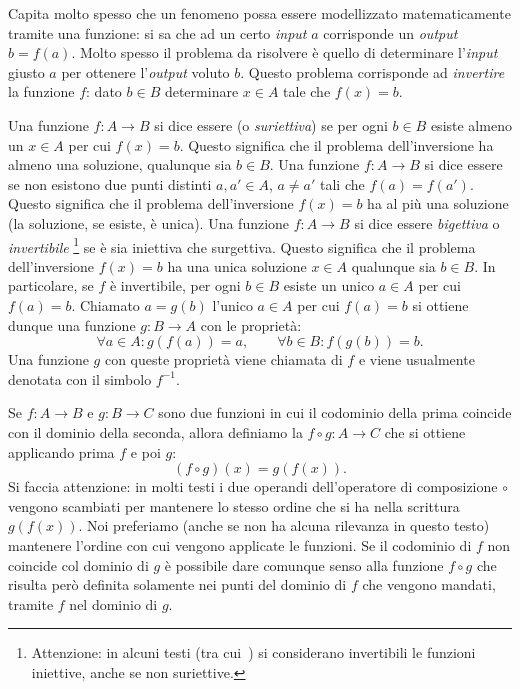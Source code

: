 Capita molto spesso che un fenomeno possa essere modellizzato matematicamente
tramite una funzione: si sa che ad un certo \emph{input} $a$ corrisponde
un \emph{output} $b=f(a)$. Molto spesso il problema da risolvere è
quello di determinare l'\emph{input} giusto $a$ per ottenere l'\emph{output}
voluto $b$. Questo problema corrisponde ad \emph{invertire} la funzione $f$:
dato $b\in B$ determinare $x\in A$ tale che $f(x) = b$.

Una funzione $f\colon A \to B$ si dice essere  (o \emph{suriettiva})
se per ogni $b\in B$ esiste almeno un $x\in A$ per cui $f(x)=b$. Questo
significa che il problema dell'inversione ha almeno una soluzione, qualunque
sia $b\in B$.
Una funzione $f\colon A \to B$ si dice essere 
se non esistono due punti distinti $a,a' \in A$, $a\neq a'$ tali
che $f(a) = f(a')$. Questo significa che il problema dell'inversione
$f(x)=b$ ha al più una soluzione (la soluzione, se esiste, è unica).
Una funzione $f\colon A \to B$ si dice essere \emph{bigettiva}
%
%
%
%
%
o
\emph{invertibile}%
\footnote{Attenzione: in alcuni testi (tra cui~\cite{Giusti}) si considerano
invertibili le funzioni iniettive, anche se non suriettive.}
se è sia iniettiva che surgettiva. Questo significa
che il problema dell'inversione $f(x)=b$ ha una unica soluzione $x\in A$
qualunque sia $b\in B$. In particolare, se $f$ è invertibile, per ogni $b\in B$ esiste
un unico $a\in A$ per cui $f(a)=b$.
Chiamato $a=g(b)$ l'unico $a\in A$ per cui $f(a)=b$
si ottiene dunque una funzione $g\colon B\to A$ con le proprietà:
\[
  \forall a\in A\colon g(f(a)) = a, \qquad
  \forall b\in B\colon f(g(b)) = b.
\]
Una funzione $g$ con queste proprietà viene chiamata 
di $f$ e viene usualmente denotata con il simbolo $f^{-1}$.

Se $f\colon A \to B$ e $g\colon B \to C$ sono due funzioni in cui
il codominio della prima coincide con il dominio della seconda, allora
definiamo la  $f\circ g\colon A \to C$
che si ottiene applicando prima $f$ e poi $g$:
\[
  (f\circ g)(x) = g(f(x)).
\]
Si faccia attenzione: in molti testi i due operandi dell'operatore
di composizione $\circ$ vengono scambiati per mantenere
lo stesso ordine che si ha nella scrittura $g(f(x))$.
Noi preferiamo (anche se non ha alcuna rilevanza in questo testo)
mantenere l'ordine con cui vengono applicate
le funzioni. Se il codominio di $f$ non coincide col dominio
di $g$ è possibile dare comunque senso alla funzione $f\circ g$
che risulta però definita solamente nei punti del dominio di
$f$ che vengono mandati, tramite $f$ nel dominio di $g$.

